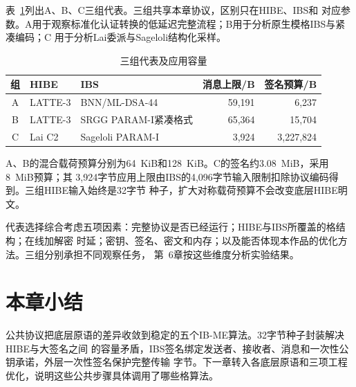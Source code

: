 表~\ref{tab:representatives}列出A、B、C三组代表。三组共享本章协议，区别只在HIBE、IBS和
对应参数。A用于观察标准化认证转换的低延迟完整流程；B用于分析原生模格IBS与紧凑编码；C
用于分析Lai委派与Sageloli结构化采样。

\begin{table}[H]
\centering\small
\caption{三组代表及应用容量}
\label{tab:representatives}
\begin{tabularx}{\textwidth}{@{}cp{}Xrr@{}}
\toprule
\rowcolor{black!8} 组 & HIBE & IBS & 消息上限/B & 签名预算/B \\
\midrule
A & LATTE-3 & BNN/ML-DSA-44 & 59,191 & 6,237 \\
B & LATTE-3 & SRGG PARAM-I紧凑格式 & 65,364 & 15,704 \\
C & Lai C2 & Sageloli PARAM-I & 3,924 & 3,227,824 \\
\bottomrule
\end{tabularx}
\end{table}

A、B的混合载荷预算分别为64~KiB和128~KiB。C的签名约3.08~MiB，采用8~MiB预算；其
3,924字节应用上限由IBS的4,096字节输入限制扣除协议编码得到。三组HIBE输入始终是32字节
种子，扩大对称载荷预算不会改变底层HIBE明文。

代表选择综合考虑五项因素：完整协议是否已经运行；HIBE与IBS所覆盖的格结构；在线加解密
时延；密钥、签名、密文和内存；以及能否体现本作品的优化方法。三组分别承担不同观察任务，
第~6章按这些维度分析实验结果。

\section{本章小结}

公共协议把底层原语的差异收敛到稳定的五个IB-ME算法。32字节种子封装解决HIBE与大签名之间
的容量矛盾，IBS签名绑定发送者、接收者、消息和一次性公钥承诺，外层一次性签名保护完整传输
字节。下一章转入各底层原语和三项工程优化，说明这些公共步骤具体调用了哪些格算法。
